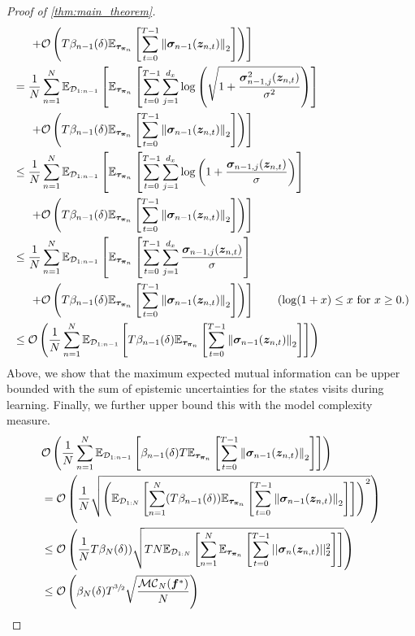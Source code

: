 \begin{proof}[Proof of  \cref{thm:main_theorem}]
\begin{align*}
        &\left. \hspace{0.5cm} + {\mathcal{O}}\left(T\beta_{n-1}(\delta) \mathbb{E}_{{\bm{\tau}}_{{\bm{\pi}}_n}}\left[\sum^{T-1}_{t=0}  \left\lVert{\bm{\sigma}}_{n-1}({\bm{z}}_{n, t})\right\rVert_2 \right]\right)\right] \\
        &= \frac{1}{N}  \sum^{N}_{n=1} \mathbb{E}_{{\mathcal{D}}_{1:n-1}}\left[\mathbb{E}_{{\bm{\tau}}_{{\bm{\pi}}_n}}\left[\sum_{t=0}^{T-1}  \sum^{d_x}_{j=1}\log \left(\sqrt{1 + \frac{{\bm{\sigma}}_{n-1, j}^2({\bm{z}}_{n, t})}{\sigma^2}}\right)\right] \right. \\
        &\left. \hspace{0.5cm} + {\mathcal{O}}\left(T\beta_{n-1}(\delta) \mathbb{E}_{{\bm{\tau}}_{{\bm{\pi}}_n}}\left[\sum^{T-1}_{t=0}  \left\lVert{\bm{\sigma}}_{n-1}({\bm{z}}_{n, t})\right\rVert_2 \right]\right)\right] \\
        &\leq \frac{1}{N}  \sum^{N}_{n=1} \mathbb{E}_{{\mathcal{D}}_{1:n-1}}\left[\mathbb{E}_{{\bm{\tau}}_{{\bm{\pi}}_n}}\left[\sum_{t=0}^{T-1}  \sum^{d_x}_{j=1}\log \left(1 + \frac{{\bm{\sigma}}_{n-1, j}({\bm{z}}_{n, t})}{\sigma}\right)\right] \right. \\
        &\left. \hspace{0.5cm} + {\mathcal{O}}\left(T\beta_{n-1}(\delta) \mathbb{E}_{{\bm{\tau}}_{{\bm{\pi}}_n}}\left[\sum^{T-1}_{t=0}  \left\lVert{\bm{\sigma}}_{n-1}({\bm{z}}_{n, t})\right\rVert_2 \right]\right)\right] \\
        &\leq \frac{1}{N}  \sum^{N}_{n=1} \mathbb{E}_{{\mathcal{D}}_{1:n-1}}\left[\mathbb{E}_{{\bm{\tau}}_{{\bm{\pi}}_n}}\left[\sum_{t=0}^{T-1} \sum^{d_x}_{j=1}\frac{{\bm{\sigma}}_{n-1, j}({\bm{z}}_{n, t})}{\sigma}\right] \right. \\
        &\left. \hspace{0.5cm} + {\mathcal{O}}\left(T\beta_{n-1}(\delta) \mathbb{E}_{{\bm{\tau}}_{{\bm{\pi}}_n}}\left[\sum^{T-1}_{t=0}  \left\lVert{\bm{\sigma}}_{n-1}({\bm{z}}_{n, t})\right\rVert_2 \right]\right)\right] \tag{$\log(1 + x) \leq x$ for $x \geq 0$.}\\
        &\leq {\mathcal{O}}\left( \frac{1}{N}  \sum^{N}_{n=1} \mathbb{E}_{{\mathcal{D}}_{1:n-1}}\left[T \beta_{n-1}(\delta)\mathbb{E}_{{\bm{\tau}}_{{\bm{\pi}}_n}}\left[\sum^{T-1}_{t=0}  \left\lVert{\bm{\sigma}}_{n-1}({\bm{z}}_{n, t})\right\rVert_2 \right]\right]\right)
        \end{align*}
        Above, we show that the maximum expected mutual information can be upper bounded with the sum of epistemic uncertainties for the states \opacex visits during learning. Finally, we further upper bound this with the model complexity measure. 
        \begin{align*}
        &{\mathcal{O}}\left( \frac{1}{N}  \sum^{N}_{n=1} \mathbb{E}_{{\mathcal{D}}_{1:n-1}}\left[\beta_{n-1}(\delta) T \mathbb{E}_{{\bm{\tau}}_{{\bm{\pi}}_n}}\left[\sum^{T-1}_{t=0}  \left\lVert{\bm{\sigma}}_{n-1}({\bm{z}}_{n, t})\right\rVert_2 \right]\right]\right) \\
        &= {\mathcal{O}}\left( \frac{1}{N}\sqrt{\left(\mathbb{E}_{{\mathcal{D}}_{1:N}}\left[\sum^{N}_{n=1} (T \beta_{n-1} (\delta))\mathbb{E}_{{\bm{\tau}}_{{\bm{\pi}}_n}}\left[\sum^{T-1}_{t=0} \left\lVert{\bm{\sigma}}_{n-1}({\bm{z}}_{n, t})\right\rVert_2\right]\right]\right)^2}\right) \\
        &\leq {\mathcal{O}}\left(\frac{1}{N} T \beta_{N}(\delta))
 \sqrt{T N \mathbb{E}_{{\mathcal{D}}_{1:N}}\left[\sum^{N}_{n=1}\mathbb{E}_{{\bm{\tau}}_{{\bm{\pi}}_n}}\left[\sum^{T-1}_{t=0} ||{\bm{\sigma}}_{n}({\bm{z}}_{n, t})||^2_2\right]\right]}\right) \\
        &\leq {\mathcal{O}}\left(\beta_{N}(\delta) T^{\sfrac{3}{2}}
 \sqrt{\frac{{{\mathcal{M}}{\mathcal{C}}}_N({\bm{f}}^*)}{N}}\right)
    \end{align*}
\end{proof}
